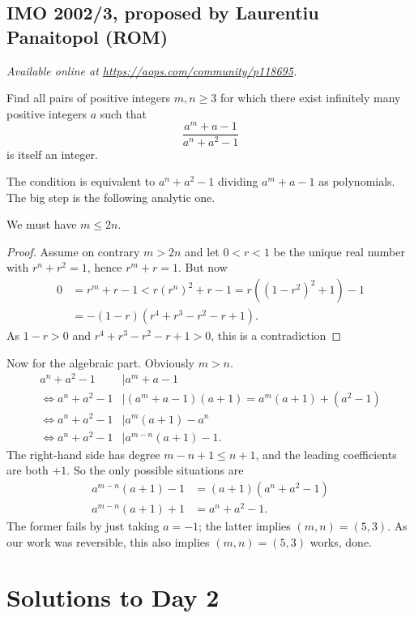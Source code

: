 \documentclass[11pt]{scrartcl}
\begin{document}
\subsection{IMO 2002/3, proposed by Laurentiu Panaitopol (ROM)}
\textsl{Available online at \url{https://aops.com/community/p118695}.}
\begin{mdframed}[style=mdpurplebox,frametitle={Problem statement}]
Find all pairs of positive integers
$m, n \ge 3$ for which there exist infinitely many
positive integers $a$ such that
\[ \frac{a^m+a-1}{a^n+a^2-1} \]
is itself an integer.
\end{mdframed}
The condition is equivalent to $a^n+a^2-1$
dividing $a^m+a-1$ as polynomials.
The big step is the following analytic one.

\begin{claim*}
  We must have $m \le 2n$.
\end{claim*}
\begin{proof}
  Assume on contrary $m > 2n$
  and let $0 < r < 1$ be the unique real number
  with $r^n+r^2 = 1$, hence $r^m+r = 1$.
  But now
  \begin{align*}
    0 &= r^m + r - 1 < r(r^n)^2 + r - 1 = r\left( (1-r^2)^2+1 \right) - 1 \\
    &= -(1-r)\left( r^4+r^3-r^2-r+1 \right).
  \end{align*}
  As $1-r > 0$ and $r^4+r^3-r^2-r+1 > 0$, this is a contradiction
\end{proof}

Now for the algebraic part.
Obviously $m > n$.
\begin{align*}
  a^n+a^2-1 &\mid a^m+a-1 \\
  \iff a^n+a^2-1 &\mid (a^m+a-1)(a+1) = a^m(a+1) + (a^2-1)  \\
  \iff a^n+a^2-1 &\mid a^m(a+1) - a^n \\
  \iff a^n+a^2-1 &\mid a^{m-n}(a+1) - 1.
\end{align*}
The right-hand side has degree $m-n+1 \le n+1$,
and the leading coefficients are both $+1$.
So the only possible situations are
\begin{align*}
  a^{m-n}(a+1) - 1 &= (a+1)\left( a^n+a^2-1 \right) \\
  a^{m-n}(a+1) + 1 &=  a^n+a^2-1.
\end{align*}
The former fails by just taking $a=-1$;
the latter implies $(m,n) = (5,3)$.
As our work was reversible, this also implies $(m,n) = (5,3)$ works, done.
\pagebreak

\section{Solutions to Day 2}
\end{document}
